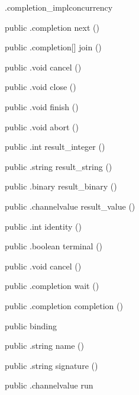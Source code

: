 \begin{CrexxClass}{.completion\_impl}{concurrency}
\begin{Members}
    \Method
      {public}
      {.completion}
      {next}
      {()}

    \Method
      {public}
      {.completion[]}
      {join}
      {()}

    \Method
      {public}
      {.void}
      {cancel}
      {()}

    \Method
      {public}
      {.void}
      {close}
      {()}

    \Method
      {public}
      {.void}
      {finish}
      {()}

    \Method
      {public}
      {.void}
      {abort}
      {()}

    \Method
      {public}
      {.int}
      {result\_integer}
      {()}

    \Method
      {public}
      {.string}
      {result\_string}
      {()}

    \Method
      {public}
      {.binary}
      {result\_binary}
      {()}

    \Method
      {public}
      {.channelvalue}
      {result\_value}
      {()}

    \Method
      {public}
      {.int}
      {identity}
      {()}

    \Method
      {public}
      {.boolean}
      {terminal}
      {()}

    \Method
      {public}
      {.void}
      {cancel}
      {()}

    \Method
      {public}
      {.completion}
      {wait}
      {()}

    \Method
      {public}
      {.completion}
      {completion}
      {()}

    \Factory
      {public}
      {binding}
      {}

    \Method
      {public}
      {.string}
      {name}
      {()}

    \Method
      {public}
      {.string}
      {signature}
      {()}

    \Method
      {public}
      {.channelvalue}
      {run}
      {}


\end{Members}
\end{CrexxClass}
